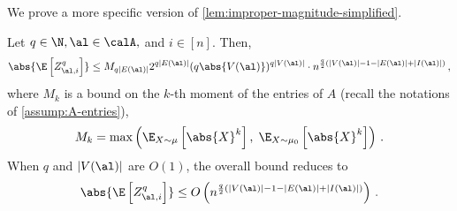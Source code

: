 \documentclass[12pt]{article}
\begin{document}
We prove a more specific version of \cref{lem:improper-magnitude-simplified}.
\begin{lemma}\label{lem:improper-magnitude}
    Let $q\in\N, \al \in \calA,$ and $i \in [n]$. Then,
    \[
        \abs{\E\left[Z_{\al,i}^q\right]} \leq M_{q|E(\al)|} 2^{q|E(\al)|}(q\abs{V(\al)})^{q|V(\al)|} \cdot n^{\frac q 2\left(|V(\al)| - 1 - |E(\al)|+|I(\al)|\right)}\,,
    \]
    where $M_{k}$ is a bound on the $k$-th moment of the entries of $A$ (recall the notations of \cref{assump:A-entries}),
    \[
        M_{k} = \max\left(\E_{X\sim \mu} \left[\abs{X}^k\right], \;
        \E_{X\sim \mu_0} \left[\abs{X}^k\right]\right) \,.
    \]
    When $q$ and $|V(\al)|$ are $O(1)$, the overall bound reduces to
    \[
        \abs{\E\left[Z_{\al,i}^q\right]} \leq O\left( n^{\frac q 2\left(|V(\al)| - 1 - |E(\al)|+|I(\al)|\right)}\right)\,.
    \]
\end{lemma}
\end{document}
